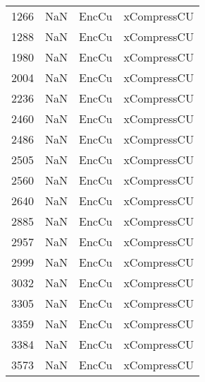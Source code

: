 \begin{tabular}{llll}
1266 &                   NaN &                      EncCu &                               xCompressCU \\
1288 &                   NaN &                      EncCu &                               xCompressCU \\
1980 &                   NaN &                      EncCu &                               xCompressCU \\
2004 &                   NaN &                      EncCu &                               xCompressCU \\
2236 &                   NaN &                      EncCu &                               xCompressCU \\
2460 &                   NaN &                      EncCu &                               xCompressCU \\
2486 &                   NaN &                      EncCu &                               xCompressCU \\
2505 &                   NaN &                      EncCu &                               xCompressCU \\
2560 &                   NaN &                      EncCu &                               xCompressCU \\
2640 &                   NaN &                      EncCu &                               xCompressCU \\
2885 &                   NaN &                      EncCu &                               xCompressCU \\
2957 &                   NaN &                      EncCu &                               xCompressCU \\
2999 &                   NaN &                      EncCu &                               xCompressCU \\
3032 &                   NaN &                      EncCu &                               xCompressCU \\
3305 &                   NaN &                      EncCu &                               xCompressCU \\
3359 &                   NaN &                      EncCu &                               xCompressCU \\
3384 &                   NaN &                      EncCu &                               xCompressCU \\
3573 &                   NaN &                      EncCu &                               xCompressCU \\

\end{tabular}
